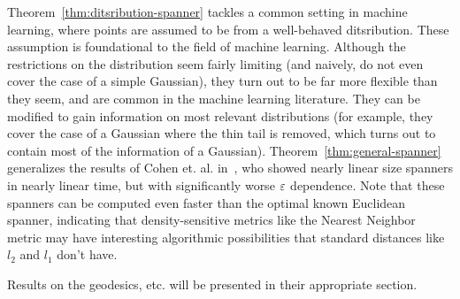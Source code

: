 Theorem~\ref{thm:ditsribution-spanner} tackles a common setting in machine
learning, where points are assumed to be from a well-behaved ditsribution.
These assumption is foundational to the field of machine learning.
Although the restrictions on the distribution seem fairly limiting (and
naively, do not even cover the case of a simple Gaussian), they turn out to
be far more flexible than they seem, and are common in the machine learning
literature. They can be modified to gain information on most relevant
distributions (for example, they cover the
case of a Gaussian where the thin tail is removed, which turns out to
contain most of the information of a Gaussian).
Theorem~\ref{thm:general-spanner} generalizes the results of Cohen et. al.
in~\cite{cohen15approximating}, who showed nearly linear size spanners in
nearly linear time, but with significantly worse $\varepsilon$ dependence. Note
that these spanners can be computed even faster than the optimal known
Euclidean spanner, indicating that density-sensitive metrics like the
Nearest Neighbor metric may have interesting algorithmic possibilities that
standard distances like $l_2$ and $l_1$ don't have.

Results on the geodesics, etc. will be presented in their appropriate
section.
